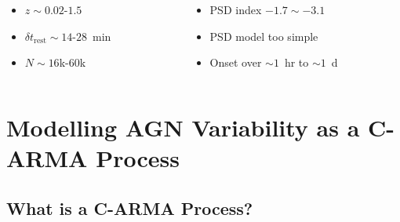 \documentclass[hyperref={pdfpagelabels=false}]{beamer}
\begin{document}
\begin{frame}
\begin{columns}
\begin{column}{0.35\textwidth}
\begin{figure}
        \end{figure}
    \end{column}
  \end{columns}
  \begin{columns}
    \centering
    \begin{column}{0.35\textwidth}
      \begin{itemize}
        \item {\footnotesize $z \sim 0.02$-$1.5$}
        \item {\footnotesize $\delta t_{\mathrm{rest}} \sim 14$-$28$~min}
        \item {\footnotesize $N \sim 16$k-$60$k}
      \end{itemize}
    \end{column}
    \begin{column}{0.35\textwidth}
      \begin{itemize}
        \item {\footnotesize PSD index $-1.7 \sim -3.1$}
        \item {\footnotesize PSD model too simple}
        \item {\footnotesize Onset over $\sim 1$~hr to $\sim 1$~d}
      \end{itemize}
    \end{column}
  \end{columns}
\end{frame}

\section{Modelling AGN Variability as a C-ARMA Process}

\subsection{What is a C-ARMA Process?}
\end{document}
